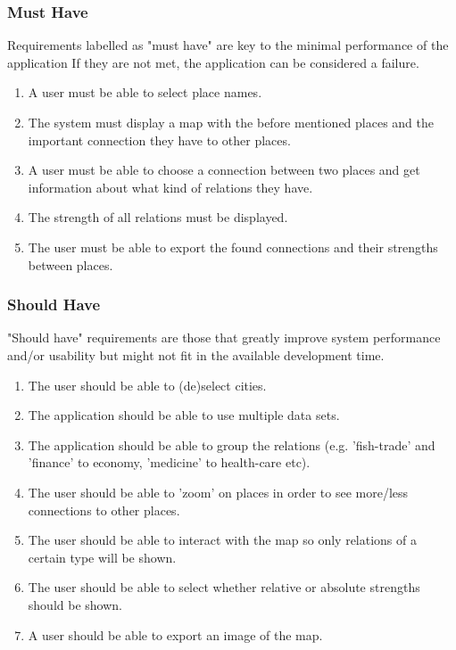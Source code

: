 \subsubsection {Must Have}
Requirements labelled as "must have" are key to the minimal performance of the application If they are not met, the application can be considered a failure.

\begin{enumerate}
    \item A user must be able to select place names.
    \item The system must display a map with the before mentioned places and the important connection they have to other places.
    \item A user must be able to choose a connection between two places and get information about what kind of relations they have.
    \item The strength of all relations must be displayed.
    \item The user must be able to export the found connections and their strengths between places.
\end{enumerate}
 
\subsubsection {Should Have}
"Should have" requirements are those that greatly improve system performance and/or usability but might not fit in the available development time.

\begin{enumerate}
    \item The user should be able to (de)select cities.
    \item The application should be able to use multiple data sets.
    \item The application should be able to group the relations (e.g. 'fish-trade' and 'finance' to economy, 'medicine' to health-care etc).
    \item The user should be able to 'zoom' on places in order to see more/less connections to other places.
    \item The user should be able to interact with the map so only relations of a certain type will be shown.
    \item The user should be able to select whether relative or absolute strengths should be shown.
    \item A user should be able to export an image of the map.
\end{enumerate}

